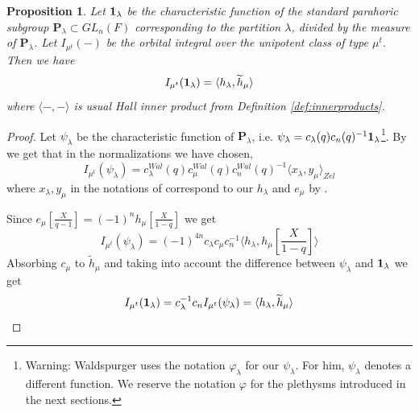 \documentclass{amsart}
\numberwithin{equation}{section}
\newtheorem{proposition}[lemma]{Proposition}%
\theoremstyle{definition}
\def\16{{\bf 16}}
\def\1{{\bf 1}}
\def\tilde{\widetilde}
\renewcommand{\th}{\tilde{h}}
\newcommand{\bP}{\mathbf{P}}
\begin{document}
\begin{proposition}
\label{prop:wpair1}
Let $\1_\lambda$ be the characteristic function of the standard parahoric subgroup $\bP_\lambda\subset GL_n(F)$
corresponding to the partition $\lambda$, {\em divided by the measure of $\bP_\lambda$}. Let $I_{\mu^t}(-)$ be the orbital integral over the unipotent class of type $\mu^t$.
Then we have 
\begin{equation}
    \label{eq:wpair1}
    I_{\mu^t}(\1_\lambda)=\langle h_\lambda,\th_\mu\rangle
\end{equation}
where $\langle -, -\rangle$ is usual  Hall inner product from Definition \ref{def:innerproducts}. 

\end{proposition}
\begin{proof}
    Let $\psi_\lambda$ be the characteristic function of $\bP_\lambda$, i.e. $\psi_\lambda=c_\lambda(q)c_n(q)^{-1} \1_\lambda$\footnote{Warning: Waldspurger uses the notation $\varphi_\lambda$ for our $\psi_\lambda$. For him, $\psi_\lambda$ denotes a different function. We reserve the notation $\varphi$ for the plethysms introduced in the next sections.}. By \cite[Prop. 4.2.]{W1} we get that in the normalizations we have chosen, 
    $$I_{\mu^t}(\psi_\lambda)=
    c_\lambda^{Wal}(q)c_{\mu}^{Wal}(q)c_n^{Wal}(q)^{-1}\langle x_\lambda, y_\mu\rangle_{Zel}
    $$ where $x_\lambda, y_\mu$ in the notations of \cite{W1, Zelevinsky} correspond to our $h_\lambda$ and $e_\mu$ by \cite[10.2.]{Zelevinsky}.

    Since $e_\mu\left[\frac{X}{q-1}\right]=(-1)^n h_\mu\left[\frac{X}{1-q}\right]$ we get $$
    I_{\mu^t}(\psi_\lambda)=(-1)^{4n} c_\lambda c_\mu c_n^{-1}\langle h_\lambda, h_\mu\left[\frac{X}{1-q}\right]\rangle
    $$ 
Absorbing $c_\mu$ to $\th_\mu$ and taking into account the difference between $\psi_\lambda$ and $\1_\lambda$ we get 
$$I_{\mu^t}(\1_\lambda)=c_\lambda^{-1} c_nI_{\mu^t}(\psi_\lambda)=\langle h_\lambda, \th_\mu\rangle$$
\end{proof}
\end{document}
